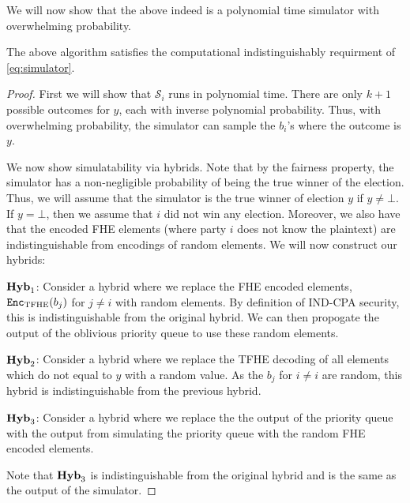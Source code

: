 We will now show that the above indeed is a polynomial time simulator with overwhelming probability.
\begin{lemma}
	The above algorithm satisfies the computational indistinguishably requirment of \cref{eq:simulator}.
	\begin{proof}
		First we will show that $\mathcal{S}_i$ runs in polynomial time. There are only $k + 1$ possible outcomes for $y$,
		each with inverse polynomial probability. Thus, with overwhelming probability, the simulator can sample the $b_i$'s where the outcome is $y$.

		We now show simulatability via hybrids.
		Note that by the fairness property, the simulator has a non-negligible probability of being the true winner of the election.
		Thus, we will assume that the simulator is the true winner of election $y$ if $y \neq \bot$. If $y = \bot$, then we assume that $i$ did not win any election.
		Moreover, we also have that the encoded FHE elements (where party $i$ does not know the plaintext)
		are indistinguishable from encodings of random elements. We will now construct our hybrids:
		
		$\mathrm{\textbf{Hyb}}_{1}$: Consider a hybrid where we replace the FHE encoded elements, $\texttt{Enc}_{\mathrm{TFHE}}(b_j)$ for $j \neq i$ with random elements.
		By definition of IND-CPA security, this is indistinguishable from the original hybrid. We can then propogate the output of the oblivious priority queue
		to use these random elements.

		$\mathrm{\textbf{Hyb}}_{2}$: Consider a hybrid where we replace the TFHE decoding of all elements which do not equal to $y$ with a random value.
		As the $b_j$ for $i \neq i$ are random, this hybrid is indistinguishable from the previous hybrid.

		$\mathrm{\textbf{Hyb}}_{3}$: Consider a hybrid where we replace the the output of the priority queue with the output from simulating the priority queue with the random FHE encoded elements.
		
		Note that $\mathrm{\textbf{Hyb}}_{3}$ is indistinguishable from the original hybrid and is the same as the output of the simulator.
	\end{proof}
\end{lemma}